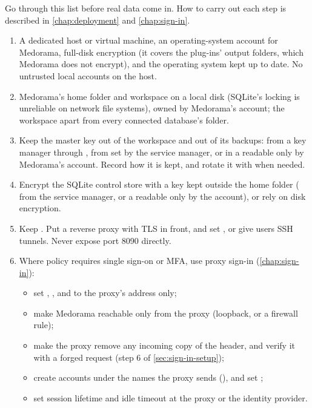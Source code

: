 Go through this list before real data come in. How to carry out each step is described in
\cref{chap:deployment} and \cref{chap:sign-in}.
\begin{enumerate}
\item A dedicated host or virtual machine, an operating-system account for Medorama, full-disk
  encryption (it covers the plug-ins' output folders, which Medorama does not encrypt), and
  the operating system kept up to date. No untrusted local accounts on the host.
\item Medorama's home folder and workspace on a local disk (SQLite's locking is unreliable on
  network file systems), owned by Medorama's account; the workspace apart from every connected
  database's folder.
\item Keep the master key out of the workspace and out of its backups: from a key manager through
  , from  set by the service manager, or
  in a  readable only by Medorama's account. Record how it is kept, and
  rotate it with  when needed.
\item Encrypt the SQLite control store with a key kept outside the home folder
  ( from the service manager, or a  readable only by the
  account), or rely on disk encryption.
\item Keep . Put a reverse proxy with TLS in front, and set
  , or give users SSH tunnels. Never expose port 8090 directly.
\item Where policy requires single sign-on or MFA, use proxy sign-in (\cref{chap:sign-in}):
  \begin{itemize}
  \item set , , and 
    to the proxy's address only;
  \item make Medorama reachable only from the proxy (loopback, or a firewall rule);
  \item make the proxy remove any incoming copy of the header, and verify it with a forged
    request (step 6 of \cref{sec:sign-in-setup});
  \item create accounts under the names the proxy sends (), and set ;
  \item set session lifetime and idle timeout at the proxy or the identity provider.
  \end{itemize}

\end{enumerate}
